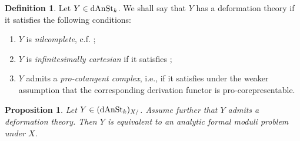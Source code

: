 \documentclass[10pt,a4paper,reqno]{amsart} %
\theoremstyle{plain}
\newtheorem{prop}[thm]{Proposition}
\theoremstyle{definition}
\newtheorem{defin}[thm]{Definition}
\theoremstyle{remark}
\numberwithin{equation}{section}
\begin{document}
\begin{defin}
    Let $Y \in \mathrm{dAnSt}_k$. We shall say that $Y$ has a deformation theory if it satisfies the following conditions:
    \begin{enumerate}
        \item $Y$ is \emph{nilcomplete}, c.f. \cite[Definition 7.4]{Porta_Yu_Representability};
        \item $Y$ is \emph{infinitesimally cartesian} if it satisfies \cite[Definition 7.3]{Porta_Yu_Representability};
        \item $Y$ admits a \emph{pro-cotangent complex}, i.e., if it satisfies \cite[Definition 7.6]{Porta_Yu_Representability} under the weaker assumption
        that the corresponding derivation functor is pro-corepresentable.
    \end{enumerate}
\end{defin}

\begin{prop} \label{prop:sufficient_conditions_for_a_prestack_to_be_equiv_to_an_analytic_FMP}
    Let $Y \in (\mathrm{dAnSt}_k)_{X/}$. Assume further that $Y$ admits a deformation theory.
    Then $Y$ is equivalent to an analytic formal moduli problem under $X$.
\end{prop}
\end{document}
